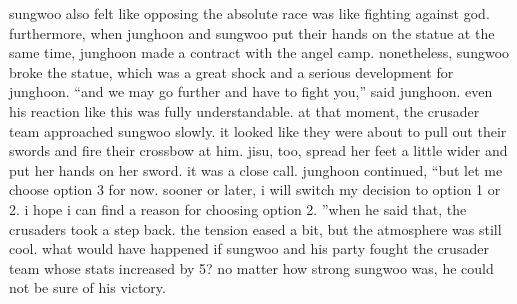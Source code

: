 sungwoo also felt like opposing the absolute race was like fighting against god.
furthermore, when junghoon and sungwoo put their hands on the statue at the same time, junghoon made a contract with the angel camp.
 nonetheless, sungwoo broke the statue, which was a great shock and a serious development for junghoon.
“and we may go further and have to fight you,” said junghoon.
even his reaction like this was fully understandable.
at that moment, the crusader team approached sungwoo slowly.
 it looked like they were about to pull out their swords and fire their crossbow at him.
jisu, too, spread her feet a little wider and put her hands on her sword.
it was a close call.
junghoon continued, “but let me choose option 3 for now.
 sooner or later, i will switch my decision to option 1 or 2.
 i hope i can find a reason for choosing option 2.
”when he said that, the crusaders took a step back.
 the tension eased a bit, but the atmosphere was still cool.
 what would have happened if sungwoo and his party fought the crusader team whose stats increased by 5? no matter how strong sungwoo was, he could not be sure of his victory.

